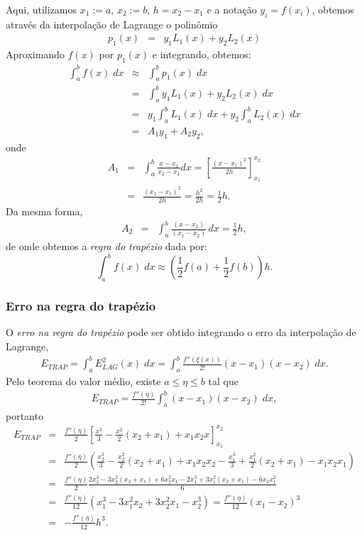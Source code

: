 Aqui, utilizamos $x_1:=a$,  $x_2:=b$, $h=x_2-x_1$ e a notação $y_i=f(x_i)$, obtemos através da interpolação de Lagrange o polinômio
\begin{eqnarray}
p_1(x) &=& y_1 L_1(x)+ y_2 L_2(x)
\end{eqnarray}
Aproximando $f(x)$ por $p_1(x)$ e integrando, obtemos:
\begin{eqnarray}
  \int_a^bf(x)\;dx &\approx& \int_a^bp_1(x)\;dx \\
    &=& \int_a^b y_1L_1(x) + y_2L_2(x)\;dx \\
    &=& y_1 \int_a^b L_1(x)\;dx + y_2 \int_a^b L_2(x)\;dx \\
    &=& A_1 y_1 + A_2 y_2,
\end{eqnarray}
onde
\begin{eqnarray}
  A_1 &=& \int_a^b\frac{x-x_1}{x_2-x_1}dx =  \left[\frac{(x-x_1)^2}{2h}\right]_{x_1}^{x_2}\\
      &=& \frac{(x_2-x_1)^2}{2h} = \frac{h^2}{2h} = \frac{1}{2}h.
\end{eqnarray}
Da mesma forma,
\begin{eqnarray}
  A_2 &=& \int_a^b\frac{(x-x_2)}{(x_1-x_2)}\,dx = \frac{1}{2}h,
\end{eqnarray}
de onde obtemos a \emph{regra do trapézio} dada por:
\begin{equation}
  \int_a^b f(x)\;dx \approx \left(\frac{1}{2}f(a) + \frac{1}{2}f(b)\right)h.
\end{equation}


\subsubsection{Erro na regra do trapézio}
O \textit{erro na regra do trapézio} pode ser obtido integrando o erro da interpolação de Lagrange,
\begin{eqnarray}
   E_{TRAP} = \int_a^b E^2_{LAG}(x) \;dx= \int_a^b \frac{f''(\xi(x))}{2!}(x-x_1)(x-x_2) \;dx.
\end{eqnarray}
Pelo teorema do valor médio, existe $a\leq \eta\leq b$ tal que
\begin{eqnarray}
    E_{TRAP} = \frac{f''(\eta)}{2!}\int_a^b (x-x_1)(x-x_2) \;dx,
\end{eqnarray}
portanto
\begin{eqnarray}
     E_{TRAP}
  &=& \frac{f''(\eta)}{2}\left[\frac{x^3}{3}-\frac{x^2}{2}(x_2+x_1)+x_1x_2x\right]_{x_1}^{x_2}\\
  &=& \frac{f''(\eta)}{2}\left(\frac{x_2^3}{3}-\frac{x_2^2}{2}(x_2+x_1)+x_1x_2x_2-\frac{x_1^3}{3}+\frac{x_1^2}{2}(x_2+x_1)-x_1x_2x_1\right)\\
  &=& \frac{f''(\eta)}{2}\frac{2x_2^3-3x_2^2(x_2+x_1)+6x_2^2x_1-2x_1^3+3x_1^2(x_2+x_1)-6x_2x_1^2}{6}\\
  &=& \frac{f''(\eta)}{12}\left(x_1^3-3x_1^2x_2+3x_2^2x_1-x_2^3\right)
   =  \frac{f''(\eta)}{12}(x_1-x_2)^3\\
  &=& -\frac{f''(\eta)}{12}h^3.
\end{eqnarray}


